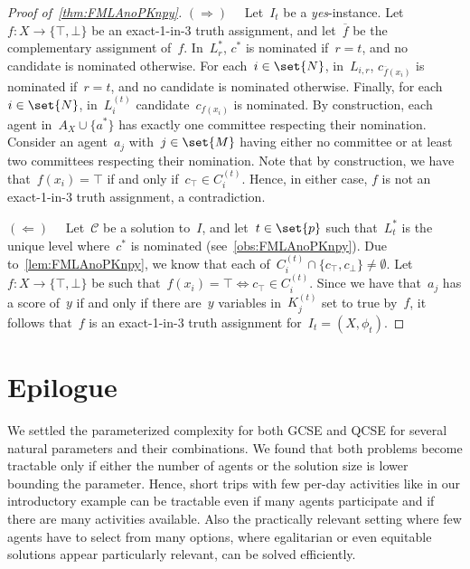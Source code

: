 \documentclass[10pt,a4paper,twocolumn]{article}
\theoremstyle{plain}
\theoremstyle{definition}
\theoremstyle{remark}
\newcommand{\prob}[1]{\textnormal{\textsc{#1}}}
\newcommand{\RD}{$(\Rightarrow)\quad$}
\newcommand{\LD}{$(\Leftarrow)\quad$}
\newcommand{\calC}{\mathcal{C}}
\newcommand{\yes}{\emph{yes}}
\newcommand{\false}{\bot}
\newcommand{\true}{\top}
\newcommand{\ol}[1]{\overline{#1}}
\newcommand{\lneg}[1]{\ensuremath{\ol{#1}}}
\newcommand{\smlaAcr}{\prob{GCSE}}
\newcommand{\fmlaAcr}{\prob{QCSE}}
\newcommand{\appendixsection}[1]{%
  \gappto{\appendixProofText}{\section{Additional Material for Section~\ref{#1}}\label{app:#1}}
}
\begin{document}
{{  \begin{proof}[Proof of~\cref{thm:FMLAnoPKnpy}]
  \RD{} 
  Let~$I_t$ be a \yes-instance.
  Let~$f\colon X\to\{\true,\false\}$ be an exact-1-in-3 truth assignment,
  and let~$\lneg{f}$ be the complementary assignment of~$f$.
  In~$L_r^*$, $c^*$ is nominated if~$r=t$,
  and no candidate is nominated otherwise.
  For each~$i\in\set{N}$,
  in~$L_{i,r}$, $c_{\lneg{f}(x_i)}$ is nominated if~$r=t$,
  and no candidate is nominated otherwise.
  Finally,
  for each~$i\in\set{N}$,
  in~$L_i^{(t)}$ candidate~$c_{f(x_i)}$ is nominated.
  By construction,
  each agent in~$A_X\cup\{a^*\}$ has exactly one committee respecting their nomination.
  Consider an agent~$a_j$ with~$j\in\set{M}$
  having either no committee or at least two committees respecting their nomination.
  Note that by construction,
  we have that~$f(x_i)=\true$ if and only if~$c_\true\in C_i^{(t)}$.
  Hence,
  in either case,
  $f$ is not an exact-1-in-3 truth assignment,
  a contradiction.
  
  \LD{}
  Let~$\calC$ be a solution to~$I$,
  and let~$t\in\set{p}$ such that~$L_t^*$ is the unique level where~$c^*$ is nominated
  (see~\cref{obs:FMLAnoPKnpy}).
  Due to~\cref{lem:FMLAnoPKnpy},
  we know that each of~$C_i^{(t)}\cap \{c_\true,c_\false\}\neq \emptyset$.
  Let~$f\colon X\to \{\true,\false\}$ be such that~$f(x_i)=\true \iff c_\true\in C_i^{(t)}$.
  Since we have that~$a_j$ has a score of~$y$ if and only if 
  there are~$y$ variables in~$K_j^{(t)}$ set to true by~$f$,
  it follows that~$f$ is an exact-1-in-3 truth assignment for~$I_t=(X,\phi_t)$.
  \end{proof}
}

%
%
%
\section{Epilogue}
\label{sec:epilogue}
\appendixsection{sec:epilogue}

We settled the parameterized complexity
for both \smlaAcr{} and \fmlaAcr{}
for several natural parameters and their combinations.
We found that both problems become tractable only
if either the number of agents
or the solution size is lower bounding the parameter.
Hence,
short trips with few per-day activities like in our introductory example
can be tractable even if many agents participate and if there are many activities available.
Also the practically relevant setting where few agents have to select from many options,
where egalitarian or even equitable solutions appear particularly relevant,
can be solved efficiently.

}
\end{document}
